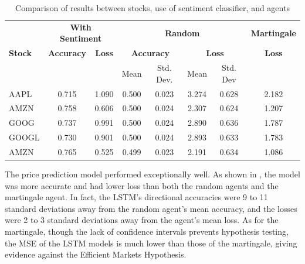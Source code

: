 \documentclass[12pt,a4paper,twoside,openright]{report}
\begin{document}
\begin{table}[H]
\centering
\begin{tabular}{lccccccc} 
\toprule
               & \multicolumn{2}{c}{\textbf{With Sentiment}}                 & \multicolumn{4}{c}{\textbf{Random}}                                                             & \textbf{Martingale}                 \bigstrut\\
\textbf{Stock} & \textbf{Accuracy}                           & \textbf{Loss} & \multicolumn{2}{c}{\textbf{Accuracy} }                 & \multicolumn{2}{c}{\textbf{Loss} }            & \textbf{Loss}                              \bigstrut\\
               &                                             &               & Mean                                       & Std. Dev. & Mean                               & Std. Dev &                                            \bigstrut\\ \midrule
AAPL           & 0.715                                       & 1.090         & 0.500                                      & 0.023     & 3.274                              & 0.628    & 2.182  \bigstrut\\
AMZN           & 0.758                                       & 0.606         & 0.500                                      & 0.024     & 2.307                              & 0.624    & 1.207  \bigstrut\\
GOOG           & 0.737                                       & 0.991         & 0.500                                      & 0.024     & 2.890                              & 0.636    & 1.787  \bigstrut\\
GOOGL          & 0.730                                       & 0.901         & 0.500                                      & 0.024     & 2.893                              & 0.633    & 1.783  \bigstrut\\
AMZN           & 0.765                                       & 0.525         & 0.499                                      & 0.023     & 2.191                              & 0.634    & 1.086  \bigstrut\\
\bottomrule
\end{tabular}
\caption{Comparison of results between stocks, use of sentiment classifier, and agents}
\label{table:results}
\end{table}

The price prediction model performed exceptionally well. As shown in , the model
was more accurate and had lower loss than both the random agents and the martingale agent.
In fact, the LSTM's directional accuracies were 9 to 11 standard deviations away from the random agent's mean accuracy,
and the losses were 2 to 3 standard deviations away from the agent's mean loss.
As for the martingale, though the lack of confidence intervals prevents hypothesis testing,
the MSE of the LSTM models is much lower than those of the martingale, giving evidence against
the Efficient Markets Hypothesis.
\end{document}
